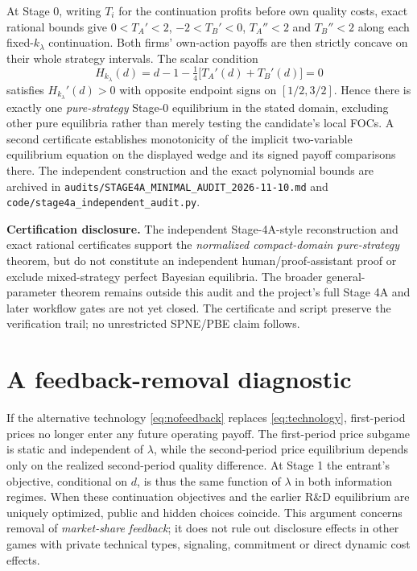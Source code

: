 \documentclass[11pt,a4paper]{article}
\numberwithin{equation}{section}
\theoremstyle{remark}
\newcommand{\kl}{k_{\lambda}}
\begin{document}
At Stage 0, writing $T_i$ for the continuation profits before own
quality costs, exact rational bounds give
$0<T_A'<2$, $-2<T_B'<0$, $T_A''<2$ and $T_B''<2$
along each fixed-$\kl$ continuation. Both firms' own-action
payoffs are then strictly concave on their whole strategy intervals.
The scalar condition
\[
H_{\kl}(d)=d-1-\tfrac14\big[T_A'(d)+T_B'(d)\big]=0
\]
satisfies $H_{\kl}'(d)>0$ with opposite endpoint signs on
$[1/2,3/2]$. Hence there is exactly one \emph{pure-strategy}
Stage-0 equilibrium in the stated domain, excluding other pure
equilibria rather than merely testing the candidate's local FOCs.
A second certificate establishes monotonicity of the implicit
two-variable equilibrium equation on the displayed wedge and
its signed payoff comparisons there. The independent construction and
the exact polynomial bounds are archived in
\texttt{audits/STAGE4A\_MINIMAL\_AUDIT\_2026-11-10.md}
and \texttt{code/stage4a\_independent\_audit.py}.

\textbf{Certification disclosure.} The independent Stage-4A-style reconstruction and exact rational certificates support the \emph{normalized compact-domain pure-strategy} theorem, but do not constitute an independent human/proof-assistant proof or exclude mixed-strategy perfect Bayesian equilibria. The broader general-parameter theorem remains outside this audit and the project's full Stage 4A and later workflow gates are not yet closed. The certificate and script preserve the verification trail; no unrestricted SPNE/PBE claim follows.

\section{A feedback-removal diagnostic}\label{app:ablation}
If the alternative technology \eqref{eq:nofeedback} replaces \eqref{eq:technology}, first-period prices no longer enter any future operating payoff. The first-period price subgame is static and independent of $\lambda$, while the second-period price equilibrium depends only on the realized second-period quality difference. At Stage 1 the entrant's objective, conditional on $d$, is thus the same function of $\lambda$ in both information regimes. When these continuation objectives and the earlier R\&D equilibrium are uniquely optimized, public and hidden choices coincide. This argument concerns removal of \emph{market-share feedback}; it does not rule out disclosure effects in other games with private technical types, signaling, commitment or direct dynamic cost effects.



\end{document}
